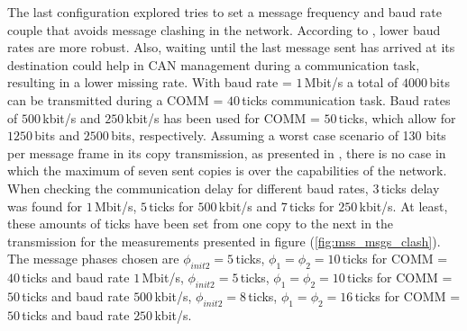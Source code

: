 \documentclass[table,xcdraw]{article}
\begin{document}
The last configuration explored tries to set a message frequency and baud rate couple that avoids message clashing in the network. According to \citep{CAN_bitrate}, lower baud rates are more robust. Also, waiting until the last message sent has arrived at its destination could help in CAN management during a communication task, resulting in a lower missing rate. With baud rate = $1\,$Mbit/s a total of $4000\,$bits can be transmitted during a COMM = $40\,$ticks communication task. Baud rates of $500\,$kbit/s and $250\,$kbit/s has been used for COMM = $50\,$ticks, which allow for $1250\,$bits and $2500\,$bits, respectively. Assuming a worst case scenario of 130 bits per message frame in its copy transmission, as presented in \citep{busload_question}, there is no case in which the maximum of seven sent copies is over the capabilities of the network. When checking the communication delay for different baud rates, $3\,$ticks delay was found for $1\,$Mbit/s, $5\,$ticks for $500\,$kbit/s and $7\,$ticks for $250\,$kbit/s. At least, these amounts of ticks have been set from one copy to the next in the transmission for the measurements presented in figure (\ref{fig:mss_msgs_clash}). The message phases chosen are $\phi_{init2} = 5\,$ticks, $\phi_1 = \phi_2 = 10\,$ticks for COMM = $40\,$ticks and baud rate $1\,$Mbit/s, $\phi_{init2} = 5\,$ticks, $\phi_1 = \phi_2 = 10\,$ticks for COMM = $50\,$ticks and baud rate $500\,$kbit/s, $\phi_{init2} = 8\,$ticks, $\phi_1 = \phi_2 = 16\,$ticks for COMM = $50\,$ticks and baud rate $250\,$kbit/s.
\end{document}
